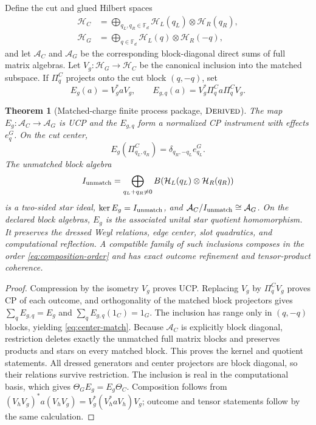 \documentclass[11pt,a4paper]{article}
\newtheorem{theorem}{Theorem}[section]
\theoremstyle{definition}
\theoremstyle{remark}
\newcommand{\Fd}{\mathbb F_d}
\newcommand{\A}{\mathcal A}
\newcommand{\Hh}{\mathcal H}
\newcommand{\status}[1]{\textsc{#1}}
\begin{document}
Define the cut and glued Hilbert spaces
\begin{align}
 \Hh_C&=\bigoplus_{q_L,q_R\in\Fd}
   \Hh_L(q_L)\otimes\Hh_R(q_R),\\
 \Hh_G&=\bigoplus_{q\in\Fd}
   \Hh_L(q)\otimes\Hh_R(-q),
 \label{eq:matched-spaces}
\end{align}
and let $\A_C$ and $\A_G$ be the corresponding block-diagonal direct sums of full
matrix algebras.  Let $V_g:\Hh_G\to\Hh_C$ be the canonical inclusion into the matched
subspace.  If $\Pi_q^C$ projects onto the cut block $(q,-q)$, set
\begin{equation}
 E_g(a)=V_g^*aV_g,\qquad
 E_{g,q}(a)=V_g^*\Pi_q^Ca\Pi_q^CV_g.
 \label{eq:matched-instrument}
\end{equation}

\begin{theorem}[Matched-charge finite process package, $\status{Derived}$]
The map $E_g:\A_C\to\A_G$ is UCP and the $E_{g,q}$ form a normalized CP
instrument with effects $e_q^G$.  On the cut center,
\begin{equation}
 E_g(\Pi_{q_L,q_R}^C)=\delta_{q_R,-q_L}e_{q_L}^G.
 \label{eq:center-match}
\end{equation}
The unmatched block algebra
\begin{equation}
 I_{\rm unmatch}=\bigoplus_{q_L+q_R\neq0}
 B(\Hh_L(q_L)\otimes\Hh_R(q_R))
 \label{eq:unmatched-ideal}
\end{equation}
is a two-sided star ideal, $\ker E_g=I_{\rm unmatch}$, and
$\A_C/I_{\rm unmatch}\cong\A_G$.  On the declared block algebras, $E_g$ is the
associated unital star quotient homomorphism.  It preserves the dressed Weyl relations,
edge center, slot quadratics, and computational reflection.  A compatible family of
such inclusions composes in the order \eqref{eq:composition-order} and has exact
outcome refinement and tensor-product coherence.
\end{theorem}

\begin{proof}
Compression by the isometry $V_g$ proves UCP.  Replacing $V_g$ by
$\Pi_q^CV_g$ proves CP of each outcome, and orthogonality of the matched block
projectors gives
$\sum_qE_{g,q}=E_g$ and $\sum_qE_{g,q}(1_C)=1_G$.  The inclusion has range only in
$(q,-q)$ blocks, yielding \eqref{eq:center-match}.  Because $\A_C$ is explicitly block
diagonal, restriction deletes exactly the unmatched full matrix blocks and preserves
products and stars on every matched block.  This proves the kernel and quotient
statements.  All dressed generators and center projectors are block diagonal, so their
relations survive restriction.  The inclusion is real in the computational basis,
which gives $\Theta_GE_g=E_g\Theta_C$.  Composition follows from
$(V_hV_g)^*a(V_hV_g)=V_g^*(V_h^*aV_h)V_g$; outcome and tensor statements follow by
the same calculation.
\end{proof}
\end{document}
